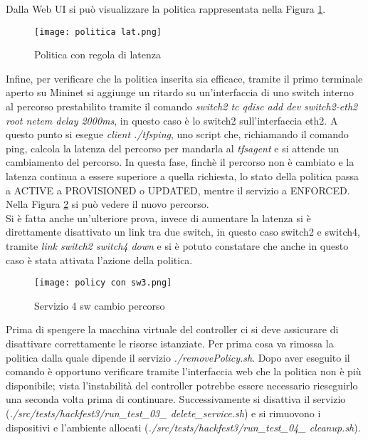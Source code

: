 Dalla Web UI si può visualizzare la politica rappresentata nella Figura \ref{fig:lat}.
\begin{figure}[h]
    \centering
    \texttt{[image: politica lat.png]}
    \caption{Politica con regola di latenza}
    \label{fig:lat}
\end{figure}
Infine, per verificare che la politica inserita sia efficace, tramite il primo terminale aperto su Mininet si 
aggiunge un ritardo su un'interfaccia di uno switch interno al percorso prestabilito tramite il comando
\textit{switch2 tc qdisc add dev switch2-eth2 root netem delay 2000ms}, in questo caso è lo switch2 sull'interfaccia eth2.
A questo punto si esegue \textit{client ./tfsping}, uno script che, richiamando il comando ping, calcola la latenza del percorso per mandarla al \textit{tfsagent} e si attende un cambiamento del percorso.
In questa fase, finchè il percorso non è cambiato e la latenza continua a essere superiore a quella richiesta,
lo stato della politica passa a ACTIVE a PROVISIONED o UPDATED, mentre il servizio a ENFORCED.
Nella Figura \ref{fig:sw4 dopo} si può vedere il nuovo percorso. 
\\Si è fatta anche un'ulteriore prova, invece di aumentare la latenza si è direttamente disattivato un link tra due switch, in questo caso switch2 e switch4,
tramite \textit{link switch2 switch4 down} e si è potuto constatare che anche in questo caso è stata attivata l'azione della politica.
\begin{figure}[h]
    \centering
    \texttt{[image: policy con sw3.png]}
    \caption{Servizio 4 sw cambio percorso}
    \label{fig:sw4 dopo}
\end{figure}
Prima di spengere la macchina virtuale del controller ci si deve assicurare di disattivare correttamente le risorse istanziate.
Per prima cosa va rimossa la politica dalla quale dipende il servizio \textit{./removePolicy.sh}. Dopo aver eseguito il comando 
è opportuno verificare tramite l'interfaccia web che la politica non è più disponibile; vista l'instabilità del controller potrebbe essere necessario rieseguirlo una seconda volta prima di continuare.
Successivamente si disattiva il servizio (\textit{./src/tests/hackfest3/run\_test\_03\_ delete\_service.sh}) e si rimuovono i dispositivi e l'ambiente allocati (\textit{./src/tests/hackfest3/run\_test\_04\_ cleanup.sh}).
